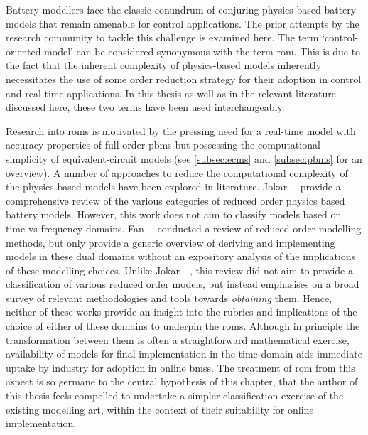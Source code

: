 

Battery modellers face the classic  conundrum of conjuring physics-based battery
models that remain amenable for control  applications. The prior attempts by the
research  community  to  tackle  this  challenge  is  examined  here.  The  term
`control-oriented model' can  be considered synonymous with  the term \gls{rom}.
This is  due to the  fact that the  inherent complexity of  physics-based models
inherently  necessitates the  use of  some  order reduction  strategy for  their
adoption in  control and real-time  applications. In this  thesis as well  as in
the  relevant  literature  discussed  here,  these  two  terms  have  been  used
interchangeably.

Research into  \glspl{rom} is  motivated by  the pressing  need for  a real-time
model  with accuracy  properties of  full-order \glspl{pbm}  but possessing  the
computational  simplicity of  equivalent-circuit models  (see \cref{subsec:ecms}
and \cref{subsec:pbms} for  an overview). A  number of approaches to  reduce the
computational  complexity of  the  physics-based models  have  been explored  in
literature. Jokar~\etal~\cite{Jokar2016}  provide a comprehensive review  of the
various categories of reduced order  physics based battery models. However, this
work  does  not aim  to  classify  models  based on  time-vs-frequency  domains.
Fan~\etal{}~\cite{Fan2015}  conducted  a  review   of  reduced  order  modelling
methods, but only provide a generic overview of deriving and implementing models
in these  dual domains  without an  expository analysis  of the  implications of
these modelling  choices. Unlike  Jokar~\etal~\cite{Jokar2016}, this  review did
not aim to provide a classification of various reduced order models, but instead
emphasises  on  a broad  survey  of  relevant  methodologies and  tools  towards
\emph{obtaining} them.  Hence, neither  of these works  provide an  insight into
the  rubrics and  implications  of the  choice  of either  of  these domains  to
underpin  the  \glspl{rom}. Although  in  principle  the transformation  between
them  is  often  a straightforward  mathematical  exercise,  availability of models for final  implementation in the time domain aids
immediate uptake by  industry for adoption in online  \glspl{bms}. The treatment
of \gls{rom} from  this aspect is so  germane to the central  hypothesis of this
chapter, that the author
of this thesis feels compelled to undertake a simpler classification exercise of
the existing modelling  art, within the context of their  suitability for online
implementation.


